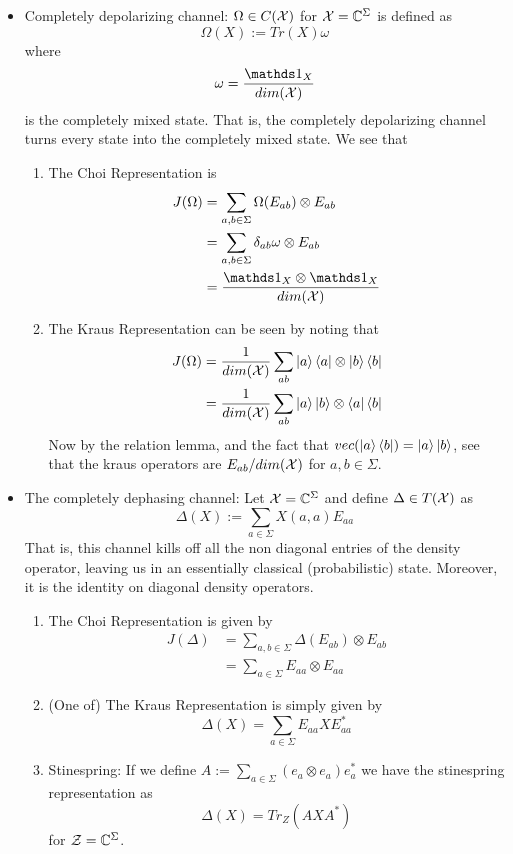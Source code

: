 \begin{itemize}
    \item Completely depolarizing channel: $\Omega \in C(\mathcal{X})$ for $\mathcal{X} = \mathbb{C}^{\Sigma}$ is defined as
    \[\Omega(X) := Tr(X)\omega\]
    where
    \[\omega = \frac{\iden_X}{dim(\X)}\]
    is the completely mixed state. That is, the completely depolarizing channel turns every state into the completely mixed state. We see that
    \begin{enumerate}
        \item The Choi Representation is
        \begin{align*}
            J(\Omega) &= \sum_{a,b\in\Sigma}\Omega(E_{ab})\otimes E_{ab} \\ 
            &= \sum_{a,b\in\Sigma}\delta_{ab}\omega\otimes E_{ab}\\ 
            &= \frac{\iden_X\otimes\iden_X}{dim(\X)}
        \end{align*}
        \item The Kraus Representation can be seen by noting that
        \begin{align*}
           J(\Omega) &= \frac{1}{dim(\mathcal{X})}\sum_{ab}\ket{a}\bra{a}\otimes \ket{b}\bra{b}  \\ 
           &= \frac{1}{dim(\mathcal{X})}\sum_{ab}\ket{a}\ket{b}\otimes \bra{a}\bra{b}
        \end{align*}
        Now by the relation lemma, and the fact that $vec(\ket{a}\bra{b}) = \ket{a}\ket{b}$, see that the kraus operators are $E_{ab}/dim(\mathcal{X})$ for $a,b\in\Sigma$.
    \end{enumerate}
    \item The completely dephasing channel: Let $\mathcal{X} = \mathbb{C}^{\Sigma}$ and define $\Delta \in T(\mathcal{X})$ as
    \[\Delta(X) := \sum_{a\in\Sigma}X(a,a)E_{aa}\]
    That is, this channel kills off all the non diagonal entries of the density operator, leaving us in an essentially classical (probabilistic) state. Moreover, it is the identity on diagonal density operators.
    \begin{enumerate}
        \item The Choi Representation is given by
        \begin{align*}
            J(\Delta) &= \sum_{a,b\in\Sigma}\Delta(E_{ab})\otimes E_{ab} \\ 
            &= \sum_{a\in\Sigma}E_{aa}\otimes E_{aa}
        \end{align*}
        \item (One of) The Kraus Representation is simply given by 
        \[\Delta(X) = \sum_{a\in\Sigma}E_{aa}XE_{aa}^*\]
        \item Stinespring: If we define $A:= \sum_{a\in\Sigma}(e_a\otimes e_a)e_a^*$ we have the stinespring representation as
        \[\Delta(X) = Tr_Z(AXA^*)\]
        for $\mathcal{Z} = \mathbb{C}^{\Sigma}$.
    \end{enumerate}
\end{itemize}


